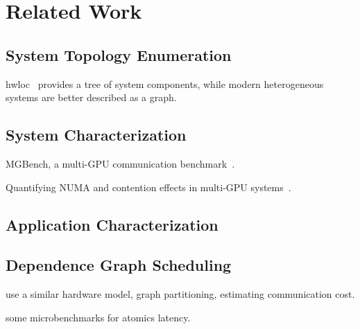 \chapter{Related Work}
\label{ch:related}

\section{System Topology Enumeration}

hwloc~\cite{broquedis2010hwloc} provides a tree of system components, while modern heterogeneous systems are better described as a graph.


\section{System Characterization}

MGBench, a multi-GPU communication benchmark~\cite{bennun2016mgbench}.

Quantifying NUMA and contention effects in multi-GPU systems~\cite{spafford2011quantifying}.

\section{Application Characterization}


\section{Dependence Graph Scheduling}

\cite{amaral2017topology} use a similar hardware model, graph partitioning, estimating communication cost.

\cite{gomez2013performance} some microbenchmarks for atomics latency.